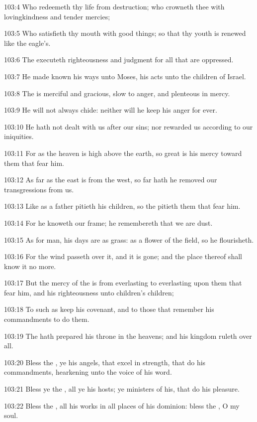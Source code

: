 103:4 Who redeemeth thy life from destruction; who crowneth thee with
lovingkindness and tender mercies;

103:5 Who satisfieth thy mouth with good things; so that thy youth is
renewed like the eagle's.

103:6 The \LORD executeth righteousness and judgment for all that are
oppressed.

103:7 He made known his ways unto Moses, his acts unto the children of
Israel.

103:8 The \LORD is merciful and gracious, slow to anger, and plenteous
in mercy.

103:9 He will not always chide: neither will he keep his anger for
ever.

103:10 He hath not dealt with us after our sins; nor rewarded us
according to our iniquities.

103:11 For as the heaven is high above the earth, so great is his
mercy toward them that fear him.

103:12 As far as the east is from the west, so far hath he removed our
transgressions from us.

103:13 Like as a father pitieth his children, so the \LORD pitieth them
that fear him.

103:14 For he knoweth our frame; he remembereth that we are dust.

103:15 As for man, his days are as grass: as a flower of the field, so
he flourisheth.

103:16 For the wind passeth over it, and it is gone; and the place
thereof shall know it no more.

103:17 But the mercy of the \LORD is from everlasting to everlasting
upon them that fear him, and his righteousness unto children's
children;

103:18 To such as keep his covenant, and to those that remember his
commandments to do them.

103:19 The \LORD hath prepared his throne in the heavens; and his
kingdom ruleth over all.

103:20 Bless the \LORD, ye his angels, that excel in strength, that do
his commandments, hearkening unto the voice of his word.

103:21 Bless ye the \LORD, all ye his hosts; ye ministers of his, that
do his pleasure.

103:22 Bless the \LORD, all his works in all places of his dominion:
bless the \LORD, O my soul.



